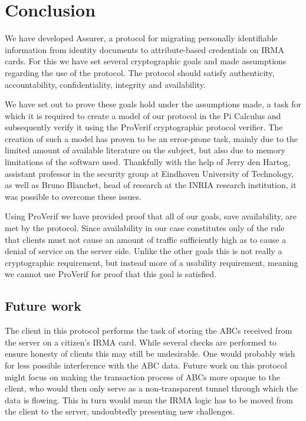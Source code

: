 \chapter{Conclusion}
\label{sec:conclusion}
We have developed Assurer, a protocol for migrating personally identifiable information from identity documents to attribute-based credentials on IRMA cards. For this we have set several cryptographic goals and made assumptions regarding the use of the protocol. The protocol should satisfy authenticity, accountability, confidentiality, integrity and availability.

We have set out to prove these goals hold under the assumptions made, a task for which it is required to create a model of our protocol in the Pi Calculus and subsequently verify it using the ProVerif cryptographic protocol verifier. The creation of such a model has proven to be an error-prone task, mainly due to the limited amount of available literature on the subject, but also due to memory limitations of the software used. Thankfully with the help of Jerry den Hartog, assistant professor in the security group at Eindhoven University of Technology, as well as Bruno Blanchet, head of research at the INRIA research institution, it was possible to overcome these issues. 

Using ProVerif we have provided proof that all of our goals, save availability, are met by the protocol. Since availability in our case constitutes only of the rule that clients must not cause an amount of traffic sufficiently high as to cause a denial of service on the server side. Unlike the other goals this is not really a cryptographic requirement, but instead more of a usability requirement, meaning we cannot use ProVerif for proof that this goal is satisfied. 

\section{Future work}
\label{sec:futurework}
The client in this protocol performs the task of storing the ABCs received from the server on a citizen's IRMA card. While several checks are performed to ensure honesty of clients this may still be undesirable. One would probably wish for less possible interference with the ABC data. Future work on this protocol might focus on making the transaction process of ABCs more opaque to the client, who would then only serve as a non-transparent tunnel through which the data is flowing. This in turn would mean the IRMA logic has to be moved from the client to the server, undoubtedly presenting new challenges.

